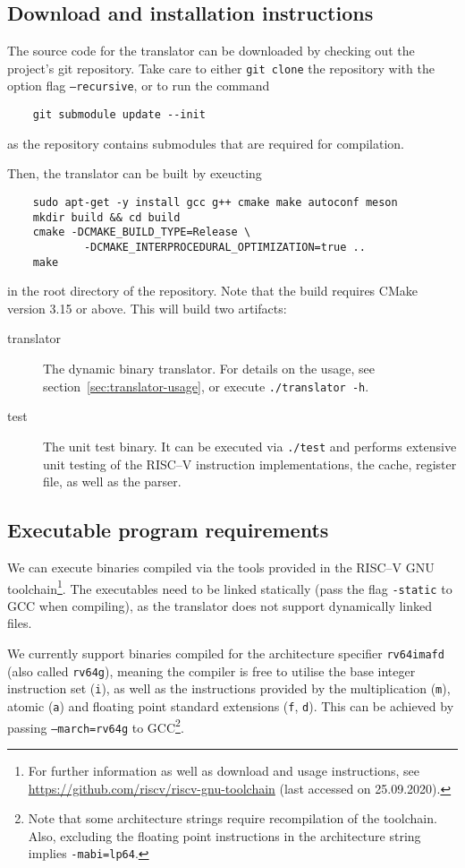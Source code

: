\subsection{Download and installation instructions}
The source code for the translator can be downloaded by checking out the project's git repository.
Take care to either \texttt{git clone} the repository with the option flag \texttt{--recursive}, or to run the command
\begin{lstlisting}
	git submodule update --init
\end{lstlisting}
as the repository contains submodules that are required for compilation.

Then, the translator can be built by exeucting
\begin{lstlisting}
	sudo apt-get -y install gcc g++ cmake make autoconf meson
	mkdir build && cd build
	cmake -DCMAKE_BUILD_TYPE=Release \
			-DCMAKE_INTERPROCEDURAL_OPTIMIZATION=true ..
	make
\end{lstlisting}
in the root directory of the repository.
Note that the build requires CMake version 3.15 or above.
This will build two artifacts:
\begin{description}
	\item[translator] The dynamic binary translator.
	For details on the usage, see section~\ref{sec:translator-usage}, or execute \texttt{./translator -h}.
	
	\item[test] The unit test binary.
	It can be executed via \texttt{./test} and performs extensive unit testing of the RISC--V instruction implementations, the cache, register file, as well as the parser.
\end{description}

\subsection{Executable program requirements}
We can execute binaries compiled via the tools provided in the RISC--V GNU toolchain\footnote{For further information as well as download and usage instructions, see \url{https://github.com/riscv/riscv-gnu-toolchain} (last accessed on 25.09.2020).}.
The executables need to be linked statically (pass the flag \texttt{-static} to GCC when compiling), as the translator does not support dynamically linked files.

We currently support binaries compiled for the architecture specifier \texttt{rv64imafd} (also called \texttt{rv64g}), meaning the compiler is free to utilise the base integer instruction set (\texttt{i}), as well as the instructions provided by the multiplication (\texttt{m}), atomic (\texttt{a}) and floating point standard extensions (\texttt{f}, \texttt{d}).
This can be achieved by passing \texttt{--march=rv64g} to GCC\footnote{Note that some architecture strings require recompilation of the toolchain. Also, excluding the floating point instructions in the architecture string implies \texttt{-mabi=lp64}.}.


